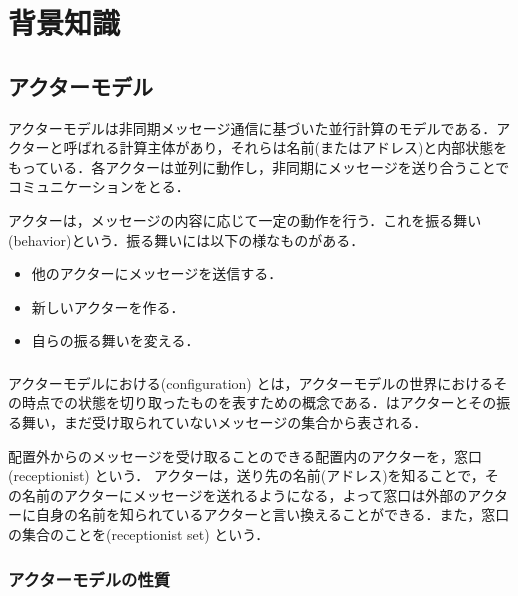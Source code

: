 \section{背景知識}


\subsection{アクターモデル}

アクターモデルは非同期メッセージ通信に基づいた並行計算のモデルである．アクターと呼ばれる計算主体があり，それらは名前(またはアドレス)と内部状態をもっている．各アクターは並列に動作し，非同期にメッセージを送り合うことでコミュニケーションをとる．

アクターは，メッセージの内容に応じて一定の動作を行う．これを振る舞い(behavior)という．振る舞いには以下の様なものがある．

\begin{itemize}
  \item 他のアクターにメッセージを送信する．
  \item 新しいアクターを作る．
  \item 自らの振る舞いを変える．
\end{itemize}

\subsubsection{\conf}

アクターモデルにおける\conf (configuration) とは，アクターモデルの世界におけるその時点での状態を切り取ったものを表すための概念である．\conf はアクターとその振る舞い，まだ受け取られていないメッセージの集合から表される．

配置外からのメッセージを受け取ることのできる配置内のアクターを，窓口 (receptionist) という．
アクターは，送り先の名前(アドレス)を知ることで，その名前のアクターにメッセージを送れるようになる，よって窓口は外部のアクターに自身の名前を知られているアクターと言い換えることができる．また，窓口の集合のことを\recep (receptionist set) という．


\subsubsection{アクターモデルの性質}

